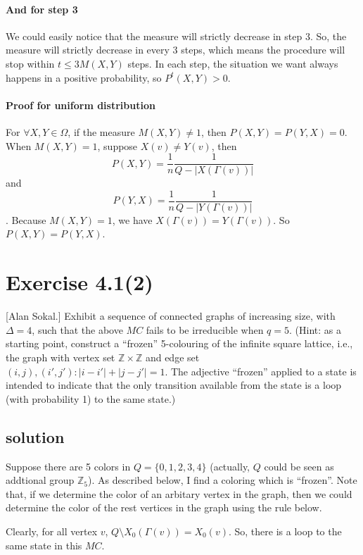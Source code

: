 \documentclass{article}
\begin{document}
\paragraph{And for step 3} We could easily notice that the measure will strictly decrease in step 3.
So, the measure will strictly decrease in every 3 steps, which means the procedure will stop within $t \leq 3M(X,Y)$ steps.  In each step, the situation we want  always happens in a positive probability, so $P^t(X,Y) > 0$.
\paragraph{Proof for uniform distribution} For $\forall X, Y\in\Omega$, if the measure $M(X,Y) \not= 1$, then $P(X, Y) = P(Y, X) = 0$. When $M(X, Y) = 1$, suppose $X(v) \not= Y(v)$, then
\[
  P(X,Y) = \frac{1}{n}\frac{1}{Q-|X(\Gamma(v))|}
\] and
\[
  P(Y,X) = \frac{1}{n}\frac{1}{Q-|Y(\Gamma(v))|}
\]. Because $M(X, Y) = 1$, we have $X(\Gamma(v)) = Y(\Gamma(v))$. So $P(X, Y) = P(Y, X)$.

\section{Exercise 4.1(2)}
[Alan Sokal.] Exhibit a sequence of connected graphs of increasing size, with $\Delta = 4$, such that the above $MC$ fails to be irreducible when $q = 5$. (Hint: as a starting point, construct a “frozen” 5-colouring of the infinite square lattice, i.e., the graph with vertex set $\mathbb{Z}\times\mathbb{Z}$ and edge set $(i, j), (i', j') : |i-i'|+|j-j'| = 1$. The adjective “frozen” applied to a state is intended to indicate that the only transition available from the state is a loop (with probability 1) to the same state.)
\subsection{solution}
Suppose there are 5 colors in $Q = \{0, 1, 2, 3, 4\}$ (actually, $Q$ could be seen as addtional group $\mathbb{Z}_5$).
As described below, I find a coloring which is ``frozen''. Note that, if we determine the color of an arbitary vertex in the graph, then we could determine the color of the rest vertices in the graph using the rule below.
\begin{center}
\end{center}
Clearly, for all vertex $v$, $Q\setminus X_0(\Gamma(v)) = X_0(v)$.
So, there is a loop to the same state in this $MC$.
\end{document}
